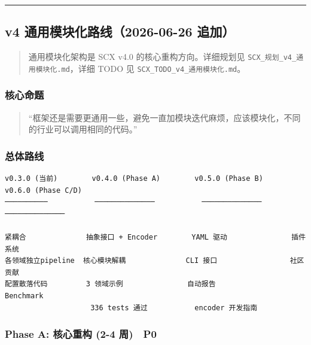 \documentclass[
  12pt,
]{ctexart}
\begin{document}
\begin{center}\rule{0.5\linewidth}{0.5pt}\end{center}

\subsection{v4 通用模块化路线（2026-06-26
追加）}\label{v4-ux901aux7528ux6a21ux5757ux5316ux8defux7ebf2026-06-26-ux8ffdux52a0}

\begin{quote}
通用模块化架构是 SCX v4.0 的核心重构方向。详细规划见
\texttt{SCX\_规划\_v4\_通用模块化.md}，详细 TODO 见
\texttt{SCX\_TODO\_v4\_通用模块化.md}。
\end{quote}

\subsubsection{核心命题}\label{ux6838ux5fc3ux547dux9898}

\begin{quote}
``框架还是需要更通用一些，避免一直加模块迭代麻烦，应该模块化，不同的行业可以调用相同的代码。''
\end{quote}

\subsubsection{总体路线}\label{ux603bux4f53ux8defux7ebf}

\begin{verbatim}
v0.3.0 (当前)        v0.4.0 (Phase A)        v0.5.0 (Phase B)        v0.6.0 (Phase C/D)
──────────           ──────────────           ──────────────           ──────────────

紧耦合              抽象接口 + Encoder        YAML 驱动               插件系统
各领域独立pipeline  核心模块解耦              CLI 接口                 社区贡献
配置散落代码         3 领域示例               自动报告                  Benchmark
                    336 tests 通过           encoder 开发指南
\end{verbatim}

\subsubsection{Phase A: 核心重构 (2-4 周) 🔴
P0}\label{phase-a-ux6838ux5fc3ux91cdux6784-2-4-ux5468-p0}
\end{document}
